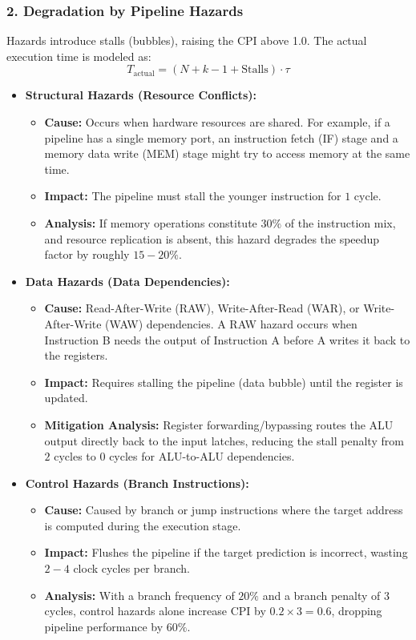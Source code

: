 \documentclass[11pt, a4paper]{article}
\begin{document}
\subsubsection*{2. Degradation by Pipeline Hazards}
Hazards introduce stalls (bubbles), raising the CPI above 1.0. The actual execution time is modeled as:
\[ T_{\text{actual}} = (N + k - 1 + \text{Stalls}) \cdot \tau \]

\begin{itemize}
    \item \textbf{Structural Hazards (Resource Conflicts):}
    \begin{itemize}
        \item \textbf{Cause:} Occurs when hardware resources are shared. For example, if a pipeline has a single memory port, an instruction fetch (IF) stage and a memory data write (MEM) stage might try to access memory at the same time.
        \item \textbf{Impact:} The pipeline must stall the younger instruction for $1$ cycle.
        \item \textbf{Analysis:} If memory operations constitute $30\%$ of the instruction mix, and resource replication is absent, this hazard degrades the speedup factor by roughly $15-20\%$.
    \end{itemize}
    \item \textbf{Data Hazards (Data Dependencies):}
    \begin{itemize}
        \item \textbf{Cause:} Read-After-Write (RAW), Write-After-Read (WAR), or Write-After-Write (WAW) dependencies. A RAW hazard occurs when Instruction B needs the output of Instruction A before A writes it back to the registers.
        \item \textbf{Impact:} Requires stalling the pipeline (data bubble) until the register is updated.
        \item \textbf{Mitigation Analysis:} Register forwarding/bypassing routes the ALU output directly back to the input latches, reducing the stall penalty from $2$ cycles to $0$ cycles for ALU-to-ALU dependencies.
    \end{itemize}
    \item \textbf{Control Hazards (Branch Instructions):}
    \begin{itemize}
        \item \textbf{Cause:} Caused by branch or jump instructions where the target address is computed during the execution stage.
        \item \textbf{Impact:} Flushes the pipeline if the target prediction is incorrect, wasting $2-4$ clock cycles per branch.
        \item \textbf{Analysis:} With a branch frequency of $20\%$ and a branch penalty of $3$ cycles, control hazards alone increase CPI by $0.2 \times 3 = 0.6$, dropping pipeline performance by $60\%$.
    \end{itemize}
\end{itemize}
\end{document}
